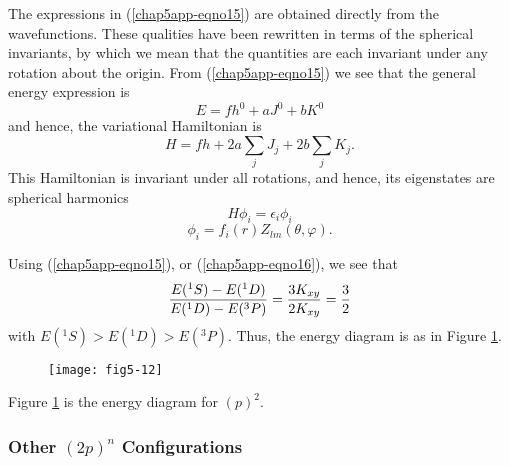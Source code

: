 The expressions in (\ref{chap5app-eqno15}) are obtained directly from
the wavefunctions.  These qualities have been rewritten in terms of
the spherical invariants, by which we mean that the quantities are
each invariant under any rotation about the origin.  From
(\ref{chap5app-eqno15}) we see that the general energy expression is
\begin{equation}
E = fh^0 + aJ^0 + b K^0
\end{equation}
and hence, the variational Hamiltonian is
\begin{equation}
H = fh + 2a \sum_{j} J_j + 2b \sum_{j} K_j .
\end{equation}
This Hamiltonian is invariant under all rotations, and hence, its 
eigenstates are spherical harmonics
\begin{equation}
H \phi_i = \epsilon_i \phi_i
\end{equation}
\begin{equation}
\phi_i = f_i (r) Z_{lm} \left( \theta , \varphi \right) .
\end{equation}

Using (\ref{chap5app-eqno15}), or (\ref{chap5app-eqno16}), we see that
\begin{equation}
{E({^1S}) - E({^1D}) \over E( {^1D} ) - E ( {^3P})} = 
{3K_{xy} \over 2K_{xy}} = {3 \over 2}
\end{equation}
with $E( {^1S} ) > E( {^1D} ) > E( {^3P} )$.  Thus, the energy diagram is as 
in Figure \ref{fig5-a-1}.
\begin{figure}
\texttt{[image: fig5-12]}
\caption{}
\label{fig5-a-1}
\end{figure}

\noindent
Figure \ref{fig5-a-1} is the energy diagram for $(p)^2$.

\subsubsection{Other $(2p)^n$ Configurations}

